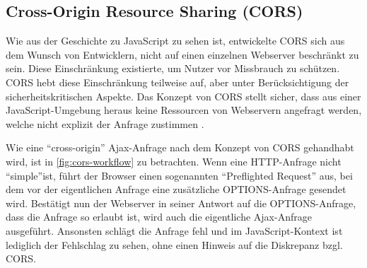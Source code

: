 
%


\subsection{Cross-Origin Resource Sharing (CORS)}

Wie aus der Geschichte zu JavaScript zu sehen ist, entwickelte CORS sich aus dem Wunsch von Entwicklern, nicht auf einen einzelnen Webserver beschränkt zu sein. Diese Einschränkung existierte, um Nutzer vor Missbrauch zu schützen. CORS hebt diese Einschränkung teilweise auf, aber unter Berücksichtigung der sicherheitskritischen Aspekte. Das Konzept von CORS stellt sicher, dass aus einer JavaScript-Umgebung heraus keine Ressourcen von Webservern angefragt werden, welche nicht explizit der Anfrage zustimmen \cite{MDNCORS}.

Wie eine \enquote{cross-origin} Ajax-Anfrage nach dem Konzept von CORS gehandhabt wird, ist in \autoref{fig:cors-workflow} zu betrachten. Wenn eine HTTP-Anfrage nicht \enquote{simple}\footnotemark ist, führt der Browser einen sogenannten \enquote{Preflighted Request} aus, bei dem vor der eigentlichen Anfrage eine zusätzliche OPTIONS-Anfrage gesendet wird. Bestätigt nun der Webserver in seiner Antwort auf die OPTIONS-Anfrage, dass die Anfrage so erlaubt ist, wird auch die eigentliche Ajax-Anfrage ausgeführt. Ansonsten schlägt die Anfrage fehl und im JavaScript-Kontext ist lediglich der Fehlschlag zu sehen, ohne einen Hinweis auf die Diskrepanz bzgl. CORS.


